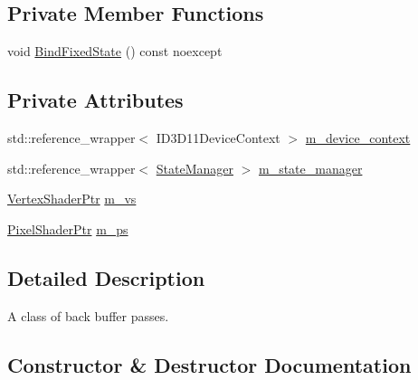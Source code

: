 \subsection*{Private Member Functions}
\begin{DoxyCompactItemize}
\item 
void \mbox{\hyperlink{classmage_1_1rendering_1_1_back_buffer_pass_a45aafe0681a6e0598d088dbf3954cfb7}{Bind\+Fixed\+State}} () const noexcept
\end{DoxyCompactItemize}
\subsection*{Private Attributes}
\begin{DoxyCompactItemize}
\item 
std\+::reference\+\_\+wrapper$<$ I\+D3\+D11\+Device\+Context $>$ \mbox{\hyperlink{classmage_1_1rendering_1_1_back_buffer_pass_ae87c0cf8b2ffe627ac44faaf61791b4f}{m\+\_\+device\+\_\+context}}
\item 
std\+::reference\+\_\+wrapper$<$ \mbox{\hyperlink{classmage_1_1rendering_1_1_state_manager}{State\+Manager}} $>$ \mbox{\hyperlink{classmage_1_1rendering_1_1_back_buffer_pass_a5d10a44c5f8a3529d64aabfb590156f2}{m\+\_\+state\+\_\+manager}}
\item 
\mbox{\hyperlink{namespacemage_1_1rendering_aaf704b9c54a4181f4950a1761de69dda}{Vertex\+Shader\+Ptr}} \mbox{\hyperlink{classmage_1_1rendering_1_1_back_buffer_pass_a12a95cc800090a0bc01d14a9f5903748}{m\+\_\+vs}}
\item 
\mbox{\hyperlink{namespacemage_1_1rendering_af03d922b228ee9c8542baaa2ecc9f259}{Pixel\+Shader\+Ptr}} \mbox{\hyperlink{classmage_1_1rendering_1_1_back_buffer_pass_a46bc7e8b3636db2eb84b42590b7bd51e}{m\+\_\+ps}}
\end{DoxyCompactItemize}


\subsection{Detailed Description}
A class of back buffer passes. 

\subsection{Constructor \& Destructor Documentation}
\mbox{\label{classmage_1_1rendering_1_1_back_buffer_pass_a054aad27e4b3d05baf235ae256934ef2}} 
